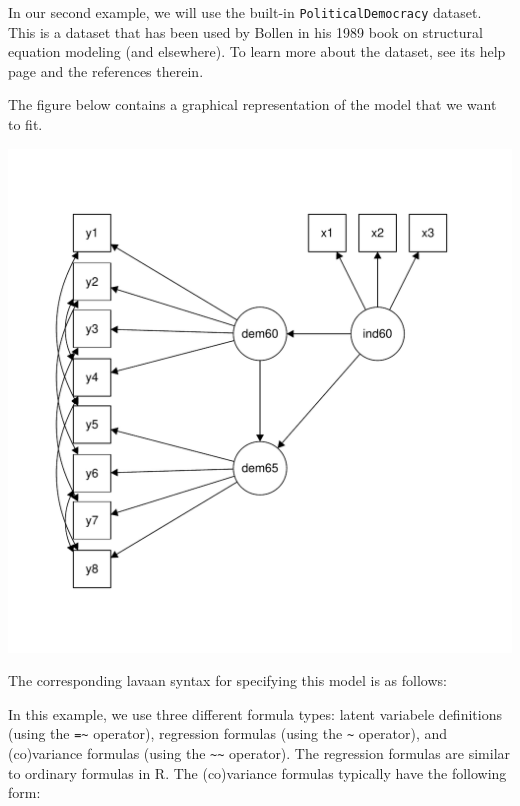 In our second example, we will use the built-in
\texttt{PoliticalDemocracy} dataset. This is a dataset that has been
used by Bollen in his 1989 book on structural equation modeling (and
elsewhere). To learn more about the dataset, see its help page and the
references therein.

The figure below contains a graphical representation of the model that
we want to fit.

\includegraphics{figure/sem-1.pdf}

The corresponding lavaan syntax for specifying this model is as follows:

\begin{Shaded}
\begin{Highlighting}[]
\end{Highlighting}
\end{Shaded}

In this example, we use three different formula types: latent variabele
definitions (using the \texttt{=\textasciitilde{}} operator), regression
formulas (using the \texttt{\textasciitilde{}} operator), and
(co)variance formulas (using the
\texttt{\textasciitilde{}\textasciitilde{}} operator). The regression
formulas are similar to ordinary formulas in R. The (co)variance
formulas typically have the following form:

